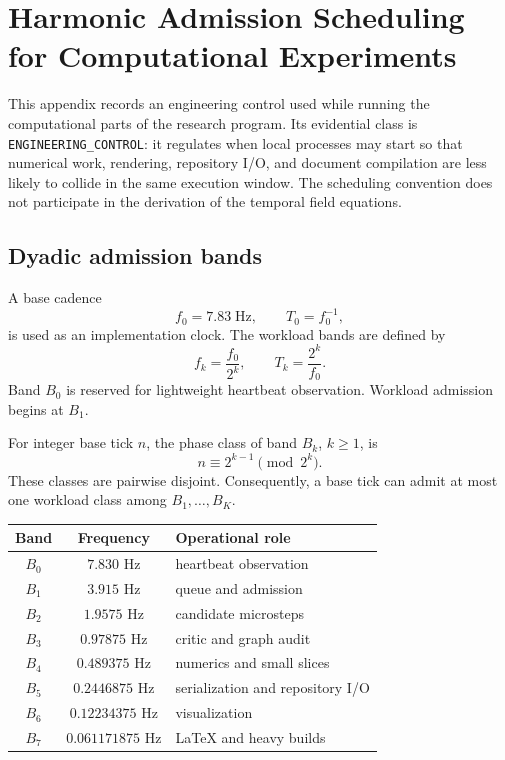 
\chapter[Harmonic Admission Scheduling]{Harmonic Admission Scheduling for Computational Experiments}
\label{app:harmonic-admission}

This appendix records an engineering control used while running the computational parts of the research program. Its evidential class is \texttt{ENGINEERING\_CONTROL}: it regulates when local processes may start so that numerical work, rendering, repository I/O, and document compilation are less likely to collide in the same execution window. The scheduling convention does not participate in the derivation of the temporal field equations.

\section{Dyadic admission bands}

A base cadence
\[
f_0 = 7.83\;\mathrm{Hz},
\qquad
T_0=f_0^{-1},
\]
is used as an implementation clock. The workload bands are defined by
\[
f_k=\frac{f_0}{2^k},
\qquad
T_k=\frac{2^k}{f_0}.
\]
Band $B_0$ is reserved for lightweight heartbeat observation. Workload admission begins at $B_1$.

For integer base tick $n$, the phase class of band $B_k$, $k\geq1$, is
\[
n\equiv 2^{k-1}\pmod{2^k}.
\]
These classes are pairwise disjoint. Consequently, a base tick can admit at most one workload class among $B_1,\ldots,B_K$.

\begin{center}
\begin{tabular}{ccl}
\hline
Band & Frequency & Operational role \\
\hline
$B_0$ & $7.830$ Hz & heartbeat observation \\
$B_1$ & $3.915$ Hz & queue and admission \\
$B_2$ & $1.9575$ Hz & candidate microsteps \\
$B_3$ & $0.97875$ Hz & critic and graph audit \\
$B_4$ & $0.489375$ Hz & numerics and small slices \\
$B_5$ & $0.2446875$ Hz & serialization and repository I/O \\
$B_6$ & $0.12234375$ Hz & visualization \\
$B_7$ & $0.061171875$ Hz & LaTeX and heavy builds \\
\hline
\end{tabular}
\end{center}

